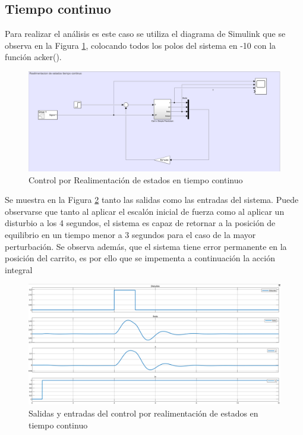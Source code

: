 \subsection{Tiempo continuo}
Para realizar el an\'alisis es este caso se utiliza el diagrama de Simulink que se observa en la Figura \ref{fig:onlyFeed}, colocando todos los polos del sistema en -10 con la funci\'on acker().
\begin{figure}[H]
	\centering
	\includegraphics[width=0.8\linewidth]{ImagenesRealimentacióndeEstados/onlyFeed}
	\caption{Control por Realimentaci\'on de estados en tiempo continuo}	
	\label{fig:onlyFeed}
\end{figure}
Se muestra en la Figura \ref{fig:onlyFeedOut} tanto las salidas como las entradas del sistema. Puede observarse que tanto al aplicar el escal\'on inicial de fuerza como al aplicar un disturbio a los 4 segundos, el sistema es capaz de retornar a la posici\'on de equilibrio en un tiempo menor a 3 segundos para el caso de la mayor perturbaci\'on.
Se observa adem\'as, que el sistema tiene error permanente en la posici\'on del carrito, es por ello que se impementa a continuaci\'on la acci\'on integral
\begin{figure}[H]
	\centering
	\includegraphics[width=0.8\linewidth]{ImagenesRealimentacióndeEstados/onlyFeedOut}
	\caption{Salidas y entradas del control por realimentaci\'on de estados en tiempo continuo}	
	\label{fig:onlyFeedOut}
\end{figure}

